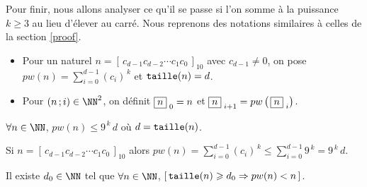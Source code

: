 Pour finir, nous allons analyser ce qu'il se passe si l'on somme à la puissance $k \geqslant 3$ au lieu d'élever au carré.
Nous reprenons des notations similaires à celles de la section \ref{proof}.
\begin{itemize}[label = \textbullet]
	\item Pour un naturel $n =  \left[ \, c_{d-1} c_{d-2} \cdots c_1 c_0 \, \right]_{10}$ avec $c_{d-1} \neq 0$,
	on pose
	$\displaystyle pw(n) = \sum_{i=0}^{d-1} (c_i)^{\,k}$
	et
	$\operatorname{\text{\normalfont\texttt{taille}}}(n) = d$.
	
	\item Pour $(n \,; i) \in \NN^2$, on définit 
	$\fbox{$n$}_{\,\,0} = n$
	et
	$\fbox{$n$}_{\,\,i+1} = pw \left( \, \fbox{$n$}_{\,\,i} \right)$.
\end{itemize}

 

\bigskip

\begin{fact}
	$\forall n \in \NN$, $pw(n) \leqslant 9^{\,k} \, d$ où $d = \operatorname{\text{\normalfont\texttt{taille}}}(n)$.
\end{fact}

\begin{proof*}
	Si $n = \left[ \, c_{d-1} c_{d-2} \cdots c_1 c_0 \, \right]_{10}$
	alors 
	$\displaystyle pw(n) = \sum_{i=0}^{d-1} (c_i)^{\,k} \leqslant \sum_{i=0}^{d-1} 9^{\,k} = 9^{\,k} \, d $.
\end{proof*}




\medskip

\begin{fact}\label{magicmajo}
	Il existe $d_0 \in \NN$ tel que $\forall n \in \NN$,	
	$[ \, \operatorname{\text{\normalfont\texttt{taille}}}(n) \geqslant d_0 \Rightarrow pw(n) < n \, ]$.
\end{fact}

